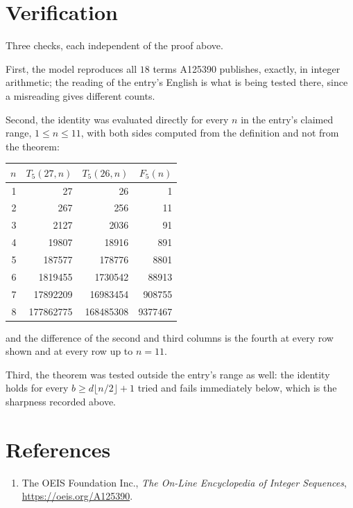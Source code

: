 \documentclass[11pt,a4paper]{article}
\theoremstyle{plain}
\theoremstyle{definition}
\begin{document}
\section{Verification}

Three checks, each independent of the proof above.

First, the model reproduces all $18$ terms A125390 publishes, exactly, in integer
arithmetic; the reading of the entry's English is what is being tested there, since a
misreading gives different counts.

Second, the identity was evaluated directly for every $n$ in the entry's claimed range,
$1\le n\le11$, with both sides computed from the definition and not from the theorem:

\begin{center}
\begin{tabular}{rrrr}
$n$ & $T_{5}(27,n)$ & $T_{5}(26,n)$ & $F_{5}(n)$ \\ \hline
1 & 27 & 26 & 1 \\
2 & 267 & 256 & 11 \\
3 & 2127 & 2036 & 91 \\
4 & 19807 & 18916 & 891 \\
5 & 187577 & 178776 & 8801 \\
6 & 1819455 & 1730542 & 88913 \\
7 & 17892209 & 16983454 & 908755 \\
8 & 177862775 & 168485308 & 9377467 \\
\end{tabular}
\end{center}

\noindent and the difference of the second and third columns is the fourth at every row shown
and at every row up to $n=11$.

Third, the theorem was tested outside the entry's range as well: the identity holds for every
$b\ge d\lfloor n/2\rfloor+1$ tried and fails immediately below, which is the sharpness recorded
above.

\section*{References}
\begin{enumerate}
\item The OEIS Foundation Inc., \emph{The On-Line Encyclopedia of Integer Sequences},
\url{https://oeis.org/A125390}.
\end{enumerate}
\end{document}
